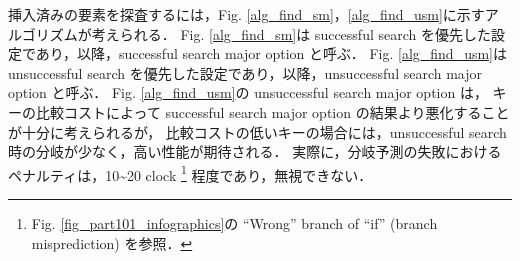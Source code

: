 挿入済みの要素を探査するには，Fig. \ref{alg_find_sm}，\ref{alg_find_usm}に示すアルゴリズムが考えられる．
Fig. \ref{alg_find_sm}は successful search を優先した設定であり，以降，successful search major option と呼ぶ．
Fig. \ref{alg_find_usm}は unsuccessful search を優先した設定であり，以降，unsuccessful search major option と呼ぶ．
\samepage\newline\indent
Fig. \ref{alg_find_usm}の unsuccessful search major option は，
キーの比較コストによって successful search major option の結果より悪化することが十分に考えられるが，
比較コストの低いキーの場合には，unsuccessful search 時の分岐が少なく，高い性能が期待される．
実際に，分岐予測の失敗におけるペナルティは，10\textasciitilde 20 clock \footnote
{
  Fig. \ref{fig_part101_infographics}の ``Wrong'' branch of ``if'' (branch misprediction) を参照．
}
程度であり，無視できない．


